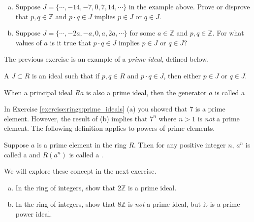 \begin{exercise}\label{exercise:rings:prime_ideals}
\begin{enumerate}[(a)]
\item Suppose $J=\{\cdots,-14,-7,0,7,14,\cdots\}$ in the example above.  Prove or disprove that $p,q\in{\mathbb Z}$ and $p\cdot q\in J$ implies $p\in J$ or $q\in J$.
\item Suppose $J=\{\cdots,-2a,-a,0,a,2a,\cdots\}$ for some $a\in{\mathbb Z}$ and $p,q\in{\mathbb Z}$.  For what values of $a$ is it true that $p\cdot q\in J$ implies $p\in J$ or $q\in J$? 
\end{enumerate}
\end{exercise}

The previous exercise is an example of a \emph{prime ideal}, defined below. 

\begin{defn}\label{prime_ideal}
A  $J\subset R$ is an ideal such that if $p,q\in R$ and $p\cdot q\in J$, then either $p\in J$ or $q\in J$.
\end{defn}

\begin{defn}\label{prime element}
When a principal ideal $Ra$ is also a prime ideal, then the generator $a$ is called a 
\end{defn}

In Exercise \ref{exercise:rings:prime_ideals} (a) you showed that $7$ is a prime element.  However, the result of (b) implies that $7^n$ where $n>1$ is \emph{not} a prime element.  The following definition applies to powers of prime elements.

\begin{defn}\label{prime_power_ideal}
Suppose $a$ is a prime element in the ring $R$.  Then for any positive integer $n$, $a^n$ is called a  and $R(a^n)$ is called a .
\end{defn}

We will explore these concept in the next exercise.

\begin{exercise}
\begin{enumerate}[(a)]
\item In the ring of integers, show that $2{\mathbb Z}$ is a prime ideal.
\item In the ring of integers, show that $8{\mathbb Z}$ is \emph{not} a prime ideal, but it is a prime power ideal.
\end{enumerate}
\end{exercise}

